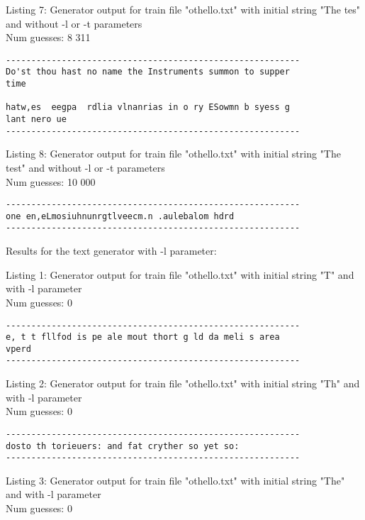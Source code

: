 \documentclass{article}
\begin{document}
Listing 7: Generator output for train file "othello.txt" with initial string "The tes" and without -l or -t parameters
\\Num guesses: 8 311

\begin{lstlisting}
----------------------------------------------------------
Do'st thou hast no name the Instruments summon to supper 
time

hatw,es  eegpa  rdlia vlnanrias in o ry ESowmn b syess g 
lant nero ue 
----------------------------------------------------------
\end{lstlisting}

Listing 8: Generator output for train file "othello.txt" with initial string "The test" and without -l or -t parameters
\\Num guesses: 10 000

\begin{lstlisting}
----------------------------------------------------------
one en,eLmosiuhnunrgtlveecm.n .aulebalom hdrd
----------------------------------------------------------
\end{lstlisting}



Results for the text generator with -l parameter:


\hfill

Listing 1: Generator output for train file "othello.txt" with initial string "T" and with -l parameter
\\Num guesses: 0

\begin{lstlisting}
----------------------------------------------------------
e, t t fllfod is pe ale mout thort g ld da meli s area 
vperd
----------------------------------------------------------
\end{lstlisting}

Listing 2: Generator output for train file "othello.txt" with initial string "Th" and with -l parameter
\\Num guesses: 0

\begin{lstlisting}
----------------------------------------------------------
dosto th torieuers: and fat cryther so yet so:
----------------------------------------------------------
\end{lstlisting}

Listing 3: Generator output for train file "othello.txt" with initial string "The" and with -l parameter
\\Num guesses: 0
\end{document}
